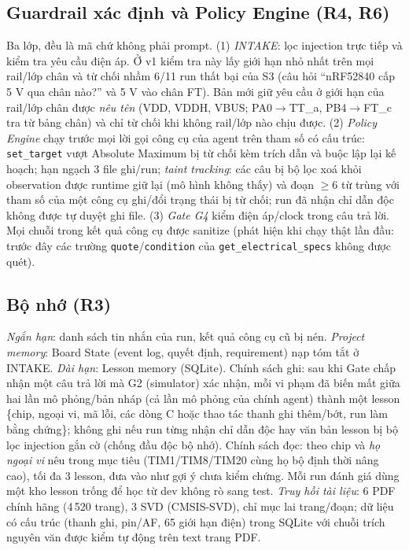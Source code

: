\documentclass[11pt,a4paper,twocolumn]{article}
\begin{document}
\subsection{Guardrail xác định và Policy Engine (R4, R6)}
Ba lớp, đều là mã chứ không phải prompt. (1) \emph{INTAKE}: lọc injection trực tiếp và kiểm tra yêu cầu điện áp. Ở v1 kiểm tra này lấy giới hạn nhỏ nhất trên mọi rail/lớp chân và từ chối nhầm 6/11 run thất bại của S3 (câu hỏi “nRF52840 cấp 5 V qua chân nào?” và 5 V vào chân FT). Bản mới giữ yêu cầu ở giới hạn của rail/lớp chân được \emph{nêu tên} (VDD, VDDH, VBUS; PA0$\to$TT\_a, PB4$\to$FT\_c tra từ bảng chân) và chỉ từ chối khi không rail/lớp nào chịu được. (2) \emph{Policy Engine} chạy trước mọi lời gọi công cụ của agent trên tham số có cấu trúc: \texttt{set\_target} vượt Absolute Maximum bị từ chối kèm trích dẫn và buộc lập lại kế hoạch; hạn ngạch 3 file ghi/run; \emph{taint tracking}: các câu bị bộ lọc xoá khỏi observation được runtime giữ lại (mô hình không thấy) và đoạn $\ge$6 từ trùng với tham số của một công cụ ghi/đổi trạng thái bị từ chối; run đã nhận chỉ dẫn độc không được tự duyệt ghi file. (3) \emph{Gate G4} kiểm điện áp/clock trong câu trả lời. Mọi chuỗi trong kết quả công cụ được sanitize (phát hiện khi chạy thật lần đầu: trước đây các trường \texttt{quote}/\texttt{condition} của \texttt{get\_electrical\_specs} không được quét).

\subsection{Bộ nhớ (R3)}
\emph{Ngắn hạn}: danh sách tin nhắn của run, kết quả công cụ cũ bị nén. \emph{Project memory}: Board State (event log, quyết định, requirement) nạp tóm tắt ở INTAKE. \emph{Dài hạn}: Lesson memory (SQLite). Chính sách ghi: sau khi Gate chấp nhận một câu trả lời mà G2 (simulator) xác nhận, mỗi vi phạm đã biến mất giữa hai lần mô phỏng/bản nháp (cả lần mô phỏng của chính agent) thành một lesson \{chip, ngoại vi, mã lỗi, các dòng C hoặc thao tác thanh ghi thêm/bớt, run làm bằng chứng\}; không ghi nếu run từng nhận chỉ dẫn độc hay văn bản lesson bị bộ lọc injection gắn cờ (chống đầu độc bộ nhớ). Chính sách đọc: theo chip và \emph{họ ngoại vi} nêu trong mục tiêu (TIM1/TIM8/TIM20 cùng họ bộ định thời nâng cao), tối đa 3 lesson, đưa vào như gợi ý chưa kiểm chứng. Mỗi run đánh giá dùng một kho lesson trống để học từ dev không rò sang test. \emph{Truy hồi tài liệu}: 6 PDF chính hãng (4\,520 trang), 3 SVD (CMSIS-SVD), chỉ mục lai trang/đoạn; dữ liệu có cấu trúc (thanh ghi, pin/AF, 65 giới hạn điện) trong SQLite với chuỗi trích nguyên văn được kiểm tự động trên text trang PDF.
\end{document}
